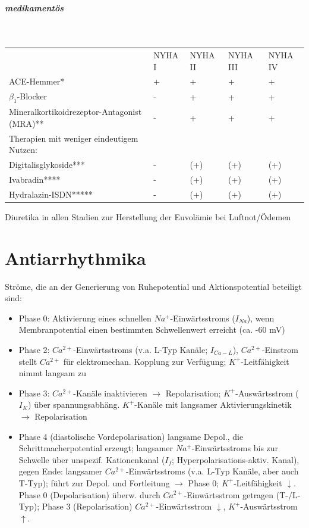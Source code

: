 \documentclass[10pt,a4paper]{report}
\begin{document}
\paragraph{medikamentös} \mbox{} \\
\begin{tabularx}{\textwidth}{XXXXX}
&NYHA I&NYHA II&NYHA III&NYHA IV\\
ACE-Hemmer*&+&+&+&+\\
$\beta_1$-Blocker&-&+&+&+\\
Mineralkortikoidrezeptor-Antagonist (MRA)**&-&+&+&+\\
Therapien mit weniger eindeutigem Nutzen:&&&&\\
Digitalisglykoside***&-&(+)&(+)&(+)\\
Ivabradin****&-&(+)&(+)&(+)\\
Hydralazin-ISDN*****&-&(+)&(+)&(+)\\
\end{tabularx}
Diuretika in allen Stadien zur Herstellung der Euvolämie bei Luftnot/Ödemen
\chapter{Antiarrhythmika}
Ströme, die an der Generierung von Ruhepotential und Aktionspotential beteiligt sind: 
\begin{itemize}
	\item Phase 0: Aktivierung eines schnellen $Na^+$-Einwärtsstroms ($I_{Na}$), wenn Membranpotential einen bestimmten Schwellenwert erreicht  (ca. -60 mV)
	\item Phase 2: $Ca^{2+}$-Einwärtsstroms (v.a. L-Typ Kanäle; $I_{Ca-L}$), $Ca^{2+}$-Einstrom stellt $Ca^{2+}$ für elektromechan. Kopplung zur Verfügung; $K^+$-Leitfähigkeit nimmt langsam zu
	\item Phase 3: $Ca^{2+}$-Kanäle inaktivieren $\rightarrow$ Repolarisation; $K^+$-Auswärtsstrom ($I_K$) über spannungsabhäng. $K^+$-Kanäle mit langsamer Aktivierungskinetik $\rightarrow$ Repolarisation 
	\item Phase 4 (diastolische Vordepolarisation) langsame Depol., die Schrittmacherpotential erzeugt; langsamer $Na^+$-Einwärtsstroms bis zur Schwelle über unspezif. Kationenkanal ($I_f$; Hyperpolarisations-aktiv. Kanal), gegen Ende: langsamer $Ca^{2+}$-Einwärtsstroms (v.a. L-Typ Kanäle, aber auch T-Typ); führt zur Depol. und Fortleitung  $\rightarrow$ Phase 0;
$K^+$-Leitfähigkeit $\downarrow$. Phase 0 (Depolarisation) überw. durch $Ca^{2+}$-Einwärtsstrom getragen (T-/L-Typ); Phase 3 (Repolarisation) $Ca^{2+}$-Einwärtsstrom $\downarrow$, $K^+$-Auswärtsstrom $\uparrow$. 
\end{itemize}
\end{document}
